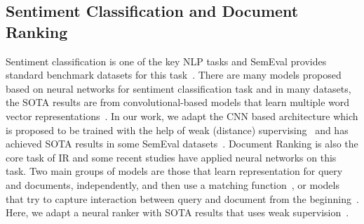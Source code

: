 \subsection{Sentiment Classification and Document Ranking}
Sentiment classification is one of the key NLP tasks and SemEval provides standard benchmark datasets for this task~\citep{rosenthal:2015,Nakov:2016,rosenthal2017semeval}. There are many models proposed based on neural networks for sentiment classification task and in many datasets, the SOTA results are from convolutional-based models that learn multiple word vector representations~\citep{Kim:2014}. In our work, we adapt the CNN based architecture which is proposed to be trained with the help of weak (distance) supervising~\citep{Severyn:2015:SIGIR,Severyn:2015:SemEval,Deriu2016:SemEval} and has achieved SOTA results in some SemEval datasets~\citep{Deriu:2017}.
%
Document Ranking is also the core task of IR and some recent studies have applied neural networks on this task. Two main groups of models are those that learn representation for query and documents, independently,  and then use a matching function~\citep{Huang:2013,Mitra:2017,Shen:2014}, or models that try to capture interaction between query and document from the beginning~\citep{Lu:2013,Guo:2016,Dehghani:2017:SIGIR,Xiong:2017}. Here, we adapt a neural ranker with SOTA results that uses weak supervision~\citep{Dehghani:2017:SIGIR,dehghani:2018:ICLR}.

